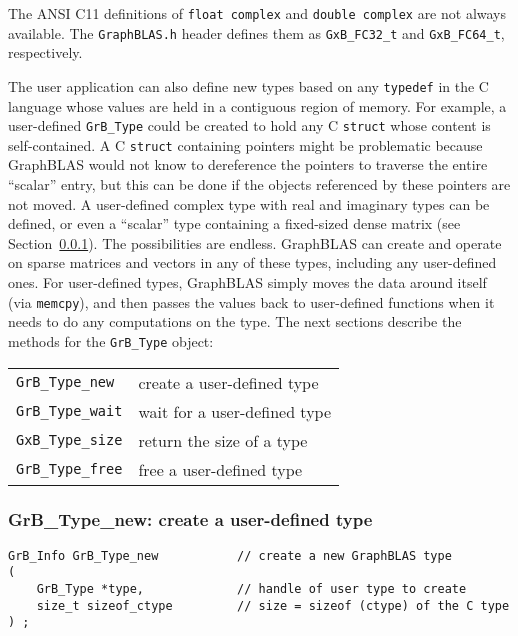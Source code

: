 \documentclass[12pt]{article}
\begin{document}
The ANSI C11 definitions of \verb'float complex' and \verb'double complex'
are not always available.  The \verb'GraphBLAS.h' header defines them as
\verb'GxB_FC32_t' and \verb'GxB_FC64_t', respectively.

The user application can also define new types based on any \verb'typedef' in
the C language whose values are held in a contiguous region of memory.  For
example, a user-defined \verb'GrB_Type' could be created to hold any C
\verb'struct' whose content is self-contained.  A C \verb'struct' containing
pointers might be problematic because GraphBLAS would not know to dereference
the pointers to traverse the entire ``scalar'' entry, but this can be done if
the objects referenced by these pointers are not moved.  A user-defined complex
type with real and imaginary types can be defined, or even a ``scalar'' type
containing a fixed-sized dense matrix (see Section~\ref{type_new}).  The
possibilities are endless.  GraphBLAS can create and operate on sparse matrices
and vectors in any of these types, including any user-defined ones.  For
user-defined types, GraphBLAS simply moves the data around itself (via
\verb'memcpy'), and then passes the values back to user-defined functions when
it needs to do any computations on the type.  The next sections describe the
methods for the \verb'GrB_Type' object:

\vspace{0.2in}
{\footnotesize
\begin{tabular}{ll}
\hline
\verb'GrB_Type_new'      & create a user-defined type \\
\verb'GrB_Type_wait'     & wait for a user-defined type \\
\verb'GxB_Type_size'     & return the size of a type \\
\verb'GrB_Type_free'     & free a user-defined type \\
\hline
\end{tabular}
}
\vspace{0.2in}

\newpage
\subsubsection{{\sf GrB\_Type\_new:} create a user-defined type}
\label{type_new}

\begin{mdframed}[userdefinedwidth=6in]
{\footnotesize
\begin{verbatim}
GrB_Info GrB_Type_new           // create a new GraphBLAS type
(
    GrB_Type *type,             // handle of user type to create
    size_t sizeof_ctype         // size = sizeof (ctype) of the C type
) ;
\end{verbatim}
}\end{mdframed}
\end{document}
